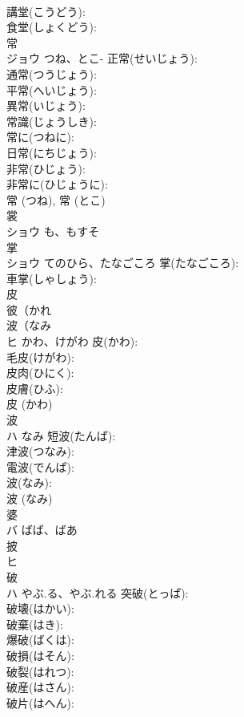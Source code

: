 \documentclass[8pt]{extreport}
\begin{document}
\begin{CJK}{UTF8}{min}
\\	講堂(こうどう): 
\\	食堂(しょくどう): 
\\	常			
\\	ジョウ	つね、とこ-	正常(せいじょう): 
\\	通常(つうじょう): 
\\	平常(へいじょう): 
\\	異常(いじょう): 
\\	常識(じょうしき): 
\\	常に(つねに): 
\\	日常(にちじょう): 
\\	非常(ひじょう): 
\\	非常に(ひじょうに): 
\\	常 (つね), 常 (とこ)
\\	裳			
\\	ショウ	も、もすそ		
\\	掌			
\\	ショウ	てのひら、たなごころ	掌(たなごころ): 
\\	車掌(しゃしょう): 
\\	皮			
\\	彼（かれ 
\\	波（なみ 
\\	ヒ	かわ、けがわ	皮(かわ): 
\\	毛皮(けがわ): 
\\	皮肉(ひにく): 
\\	皮膚(ひふ): 
\\	皮 (かわ)
\\	波			
\\	ハ	なみ	短波(たんぱ): 
\\	津波(つなみ): 
\\	電波(でんぱ): 
\\	波(なみ): 
\\	波 (なみ)
\\	婆			
\\	バ	ばば、ばあ		
\\	披			
\\	ヒ			
\\	破			
\\	ハ	やぶ.る、やぶ.れる	突破(とっぱ): 
\\	破壊(はかい): 
\\	破棄(はき): 
\\	爆破(ばくは): 
\\	破損(はそん): 
\\	破裂(はれつ): 
\\	破産(はさん): 
\\	破片(はへん): 

\end{CJK}
\end{document}
